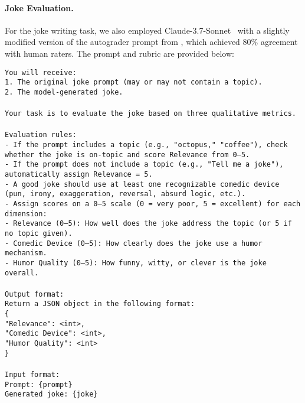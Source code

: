 \newpage
\paragraph{Joke Evaluation.} For the joke writing task, we also  employed Claude-3.7-Sonnet~\citep{anthropic2025claude37} with a slightly modified version of the autograder prompt from \citet{narad_which_2025}, which achieved 80\% agreement with human raters. The prompt and rubric are provided below:
\begin{tcolorbox}[colback=blue!5!white, colframe=blue!75!black, title=Joke Autograder Rubric]
\small
\texttt{You will receive:\\
1. The original joke prompt (may or may not contain a topic).\\
2. The model-generated joke.\\
\\
Your task is to evaluate the joke based on three qualitative metrics.\\
\\
Evaluation rules:\\
- If the prompt includes a topic (e.g., "octopus," "coffee"), check whether the joke is on-topic and score Relevance from 0–5.\\
- If the prompt does not include a topic (e.g., "Tell me a joke"), automatically assign Relevance = 5.\\
- A good joke should use at least one recognizable comedic device (pun, irony, exaggeration, reversal, absurd logic, etc.).\\
- Assign scores on a 0–5 scale (0 = very poor, 5 = excellent) for each dimension:\\
  - Relevance (0–5): How well does the joke address the topic (or 5 if no topic given).\\
  - Comedic Device (0–5): How clearly does the joke use a humor mechanism.\\
  - Humor Quality (0–5): How funny, witty, or clever is the joke overall.\\
\\
Output format:\\
Return a JSON object in the following format:\\
\{\\
  "Relevance": <int>,\\
  "Comedic Device": <int>,\\
  "Humor Quality": <int>\\
\}\\
\\
Input format:\\
Prompt: \{prompt\}\\
Generated joke: \{joke\}}
\end{tcolorbox}

